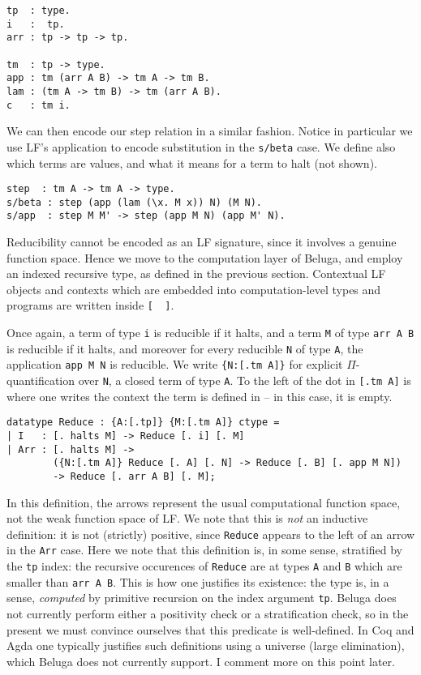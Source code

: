 \documentclass{article}
\begin{document}
\begin{lstlisting}
tp  : type.               
i   :  tp.
arr : tp -> tp -> tp.

tm  : tp -> type.
app : tm (arr A B) -> tm A -> tm B.
lam : (tm A -> tm B) -> tm (arr A B).
c   : tm i.
\end{lstlisting}

We can then encode our step relation in a similar fashion. Notice in
particular we use LF's application to encode substitution in the
\lstinline{s/beta} case. We define also which terms are values, and
what it means for a term to halt (not shown). 

\begin{lstlisting}
step  : tm A -> tm A -> type.
s/beta : step (app (lam (\x. M x)) N) (M N).
s/app  : step M M' -> step (app M N) (app M' N).
\end{lstlisting}

Reducibility cannot be encoded as an LF signature, since it
involves a genuine function space. Hence we move to the
computation layer of Beluga, and employ an
indexed recursive type, as defined in the previous section. Contextual LF objects
and contexts which are embedded into computation-level types and programs are 
written inside \lstinline![  ]!. 

Once again, a term of type \lstinline{i} is reducible if it halts, and a term
\lstinline{M} of
type \lstinline{arr A B} is reducible if it halts, and moreover for every
reducible \lstinline{N} of type \lstinline{A}, the application
\lstinline{app M N} is reducible. We write \lstinline!{N:[.tm A]}!
for explicit $\Pi$-quantification over \lstinline{N}, a closed term of type
\lstinline!A!. To the left of the dot in \lstinline{[.tm A]} is where
one writes the context the term is defined in -- in this case, it is empty.

\begin{lstlisting}
datatype Reduce : {A:[.tp]} {M:[.tm A]} ctype =
| I   : [. halts M] -> Reduce [. i] [. M]
| Arr : [. halts M] ->
        ({N:[.tm A]} Reduce [. A] [. N] -> Reduce [. B] [. app M N])
        -> Reduce [. arr A B] [. M];
\end{lstlisting}

In this definition, the arrows represent the usual computational
function space, not the weak function space of LF. We note that this
is \emph{not} an inductive definition: it is not (strictly) positive, since \lstinline{Reduce}
appears to the left of an arrow in the \lstinline{Arr} case. Here we note that this
definition is, in some sense, stratified by the \lstinline{tp} index: the recursive occurences of
\lstinline{Reduce} are at types \lstinline{A} and \lstinline{B} which
are smaller than \lstinline{arr A B}. This is how one justifies its
existence: the type is, in a sense, \emph{computed} by primitive
recursion on the index argument \lstinline{tp}. Beluga does not currently perform either a positivity check
or a stratification check, so in the present we must convince ourselves that this
predicate is well-defined. In Coq \citep{bertot/casteran:2004} and Agda
\citep{Norell:phd07} one typically justifies such definitions using a
universe (large elimination), which Beluga does not currently
support. I comment more on this point later.
\end{document}
